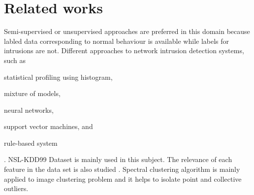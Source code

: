 \section{Related works}
Semi-supervised or unsupervised approaches are preferred in this domain\cite{chandola09} because labled data corresponding to normal behaviour is available while labels for intrusions are not. Different approaches to network intrusion detection systems, such as \begin{inparaenum} \item statistical profiling using histogram, \item mixture of models, \item neural networks, \item support vector machines, and \item rule-based system\end{inparaenum}. NSL-KDD99 Dataset is mainly used in this subject\cite{tavallaee09}. The relevance of each feature in the data set is also studied\cite{olusola10} \cite{kayacik05}. Spectral clustering algorithm is mainly applied to image clustering problem and it helps to isolate point and collective outliers.
